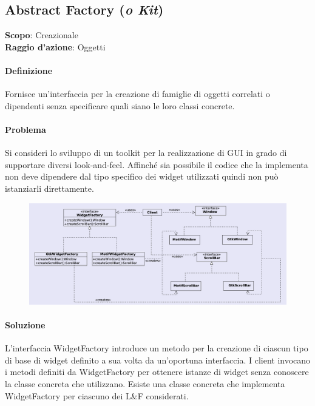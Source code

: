 \subsection{Abstract Factory (\textit{o Kit})}
\label{abstract-factory}

\textbf{Scopo}: Creazionale \\
\textbf{Raggio d'azione}: Oggetti

\paragraph{Definizione} Fornisce un’interfaccia per la creazione di famiglie di oggetti correlati o dipendenti senza specificare quali siano le loro classi concrete.

\paragraph{Problema} Si consideri lo sviluppo di un toolkit per la realizzazione di GUI in grado di supportare diversi look-and-feel. Affinché sia possibile il codice che la implementa non deve dipendere dal tipo specifico dei widget utilizzati quindi non può istanziarli direttamente.

\begin{figure}[H]
    \centering
    \includegraphics[width=1\linewidth]{assets/pattern/abstract-factory/abstract-factory-esempio.png}
\end{figure}

\paragraph{Soluzione} L’interfaccia WidgetFactory introduce un metodo per la creazione di ciascun tipo di base di widget definito a sua volta da un’oportuna interfaccia. I client invocano i metodi definiti da WidgetFactory per ottenere istanze di widget senza conoscere la classe concreta che utilizzano. Esiste una classe concreta che implementa WidgetFactory per ciascuno dei L\&F considerati.

